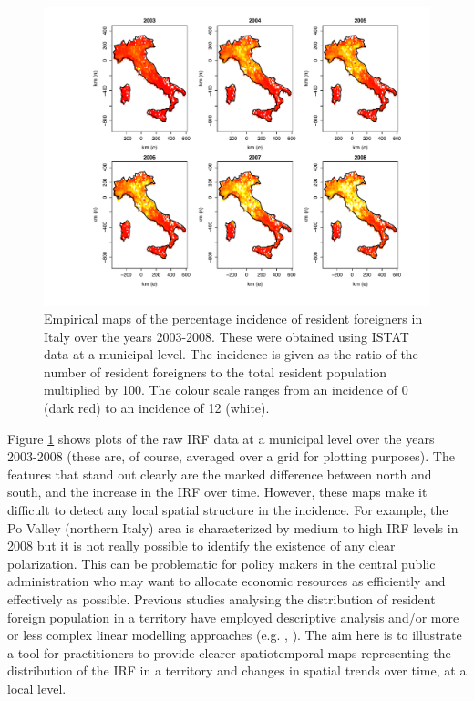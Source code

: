 \begin{figure}[tbp]
	\centering
		\includegraphics[width=\textwidth]{it/Raw}
	\caption{Empirical maps of the percentage incidence of resident foreigners in Italy over the years 2003-2008. These were obtained using ISTAT data at a municipal level.	The incidence is given as the ratio of the number of resident foreigners to the total resident population multiplied by 100. The colour scale ranges from an incidence of 0 (dark red) to an incidence of 12 (white).}
	\label{Rd}
\end{figure}

Figure \ref{Rd} shows plots of the raw IRF data at a municipal level over the years 2003-2008 (these are, of course, averaged over a grid for plotting purposes). The features that stand out clearly are the marked difference between north and south, and the increase in the IRF over time. However, these maps make it difficult to detect any local spatial structure in the incidence. For example, the Po Valley (northern Italy) area is characterized by medium to high IRF levels in 2008 but it is not really possible to identify the existence of any clear polarization. This can be problematic for policy makers in the central public administration who may want to allocate economic resources as efficiently and effectively as possible. Previous studies analysing the distribution of resident foreign population in a territory have employed descriptive analysis and/or more or less complex linear modelling approaches (e.g. \cite{Fonseca2008}, \cite{Longhi2010}). The aim here is to illustrate a tool for practitioners to provide clearer spatiotemporal maps representing the distribution of the IRF in a territory and changes in spatial trends over time, at a local level. 

